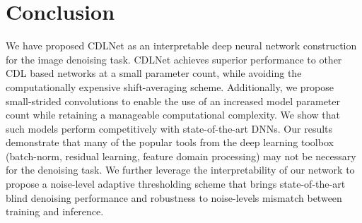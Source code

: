 \documentclass[conference]{IEEEtran}
\newcommand{\soa}{state-of-the-art }
\begin{document}
\section{Conclusion}
We have proposed CDLNet as an interpretable deep neural network construction for the image denoising task. CDLNet achieves superior performance to other CDL based networks at a small parameter count, while avoiding the computationally expensive shift-averaging scheme. Additionally, we propose small-strided convolutions to enable the use of an increased model parameter count while retaining a manageable computational complexity. We show that such models perform competitively with \soa DNNs. Our results demonstrate that many of the popular tools from the deep learning toolbox (batch-norm, residual learning, feature domain processing) may not be necessary for the denoising task. We further leverage the interpretability of our network to propose a noise-level adaptive thresholding scheme that brings \soa blind denoising performance and robustness to noise-levels mismatch between training and inference.


 
\end{document}
